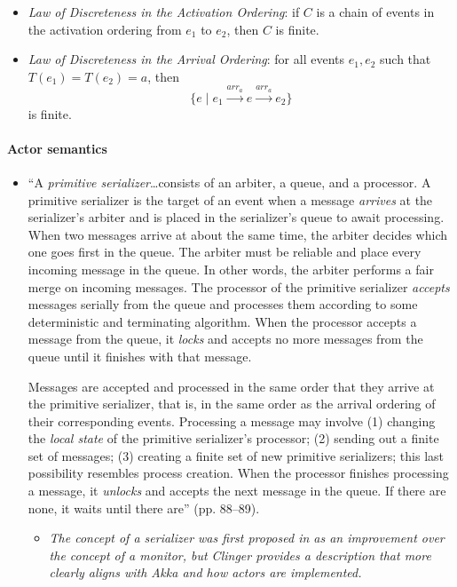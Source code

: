 \begin{itemize}
\begin{itemize}
		\begin{itemize}
		\item \emph{Law of Discreteness in the Activation Ordering}: if $C$ is a chain of events in the activation ordering from $e_1$ to $e_2$, then $C$ is finite.
		\item \emph{Law of Discreteness in the Arrival Ordering}: for all events $e_1, e_2$ such that $T(e_1) = T(e_2) = a$, then
			\begin{equation*}
			\{e \mid e_1 \overset{arr_a}{\longrightarrow} e \overset{arr_a}{\longrightarrow} e_2\}
			\end{equation*}
		is finite.
		\end{itemize}
	\end{itemize}
\end{itemize}

\paragraph{Actor semantics}
\begin{itemize}
\item ``A \emph{primitive serializer}{\ldots}consists of an arbiter, a queue, and a processor. A primitive serializer is the target of an event when a message \emph{arrives} at the serializer's arbiter and is placed in the serializer's queue to await processing. When two messages arrive at about the same time, the arbiter decides which one goes first in the queue. The arbiter must be reliable and place every incoming message in the queue. In other words, the arbiter performs a fair merge on incoming messages. The processor of the primitive serializer \emph{accepts} messages serially from the queue and processes them according to some deterministic and terminating algorithm. When the processor accepts a message from the queue, it \emph{locks} and accepts no more messages from the queue until it finishes with that message.

Messages are accepted and processed in the same order that they arrive at the primitive serializer, that is, in the same order as the arrival ordering of their corresponding events. Processing a message may involve (1) changing the \emph{local state} of the primitive serializer's processor; (2) sending out a finite set of messages; (3) creating a finite set of new primitive serializers; this last possibility resembles process creation. When the processor finishes processing a message, it \emph{unlocks} and accepts the next message in the queue. If there are none, it waits until there are'' (pp. 88--89).
	\begin{itemize}
	\item \emph{The concept of a serializer was first proposed in \cite{Atkinson1977} as an improvement over the concept of a monitor, but Clinger provides a description that more clearly aligns with Akka and how actors are implemented.}
	\end{itemize}
\end{itemize}

